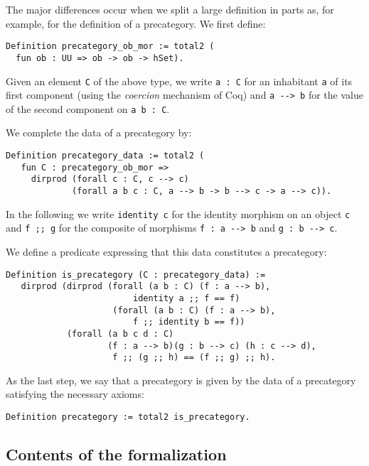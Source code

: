 The major differences occur when we split a large definition in parts as, for example, for the definition of a precategory. 
We first define:


\begin{lstlisting}
Definition precategory_ob_mor := total2 (
  fun ob : UU => ob -> ob -> hSet).
\end{lstlisting}
%
Given an element \lstinline!C! of the above type, we write \lstinline!a : C!
for an inhabitant \lstinline!a! of its first component (using the \emph{coercion} mechanism of \textsf{Coq}) and \lstinline!a --> b! for the value of the second 
component on \lstinline!a b : C!.

We complete the data of a precategory by:

\begin{lstlisting}
Definition precategory_data := total2 (
   fun C : precategory_ob_mor =>
     dirprod (forall c : C, c --> c)
             (forall a b c : C, a --> b -> b --> c -> a --> c)).
\end{lstlisting}
In the following we write \lstinline!identity c! for the identity morphism
on an object \lstinline!c! and \lstinline!f ;; g! for the composite of 
morphisms \lstinline!f : a --> b! and \lstinline!g : b --> c!.

We define a predicate expressing that this data constitutes a precategory:
\begin{lstlisting}
Definition is_precategory (C : precategory_data) :=
   dirprod (dirprod (forall (a b : C) (f : a --> b),
                         identity a ;; f == f)
                     (forall (a b : C) (f : a --> b),
                         f ;; identity b == f))
            (forall (a b c d : C)
                    (f : a --> b)(g : b --> c) (h : c --> d),
                     f ;; (g ;; h) == (f ;; g) ;; h).
\end{lstlisting}
As the last step, we say that a precategory is given by the data of a precategory
satisfying the necessary axioms:
\begin{lstlisting}
Definition precategory := total2 is_precategory.
\end{lstlisting}







\subsection*{Contents of the formalization}

